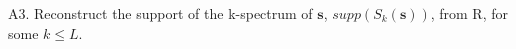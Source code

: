 \documentclass[preview]{standalone}
\begin{document}
\begin{center}
A3. Reconstruct the support of the k-spectrum of $\textbf{s}$, $supp({S}_k(\textbf{s}))$, from R, for some $k \le L$.
\end{center}
\end{document}

